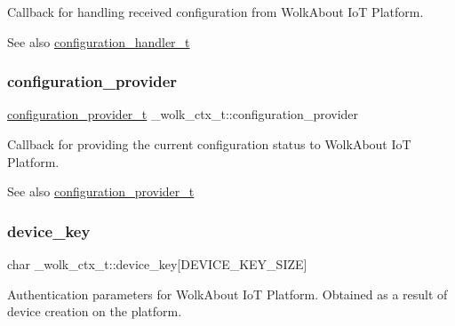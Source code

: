 Callback for handling received configuration from Wolk\+About IoT Platform. \begin{DoxySeeAlso}{See also}
\hyperlink{WolkConn_8h_a6662d0d41546795466cc2b398d8dcb08}{configuration\+\_\+handler\+\_\+t} 
\end{DoxySeeAlso}
\mbox{\label{struct__wolk__ctx__t_a4b2c98179054515e4288812f21bff3a4}} 
\subsubsection{\texorpdfstring{configuration\+\_\+provider}{configuration\_provider}}
{\footnotesize\ttfamily \hyperlink{WolkConn_8h_a64d56254d09f9e452751f32b3c5a39d3}{configuration\+\_\+provider\+\_\+t} \+\_\+wolk\+\_\+ctx\+\_\+t\+::configuration\+\_\+provider}

Callback for providing the current configuration status to Wolk\+About IoT Platform. \begin{DoxySeeAlso}{See also}
\hyperlink{WolkConn_8h_a64d56254d09f9e452751f32b3c5a39d3}{configuration\+\_\+provider\+\_\+t} 
\end{DoxySeeAlso}
\mbox{\label{struct__wolk__ctx__t_a52168fce420127bfa577ffea6fce0306}} 
\subsubsection{\texorpdfstring{device\+\_\+key}{device\_key}}
{\footnotesize\ttfamily char \+\_\+wolk\+\_\+ctx\+\_\+t\+::device\+\_\+key\mbox{[}D\+E\+V\+I\+C\+E\+\_\+\+K\+E\+Y\+\_\+\+S\+I\+ZE\mbox{]}}

Authentication parameters for Wolk\+About IoT Platform. Obtained as a result of device creation on the platform. \mbox{\label{struct__wolk__ctx__t_a3a57dc7e7475697302709e722863e736}} 
